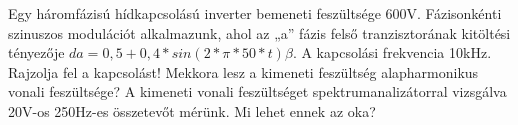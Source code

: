 \begin{example}

Egy háromfázisú hídkapcsolású inverter bemeneti feszültsége 600V. Fázisonkénti szinuszos modulációt alkalmazunk, ahol az „a” fázis felső tranzisztorának kitöltési tényezője $da=0,5+0,4*sin(2*\pi{}*50*t)\beta{}$. A kapcsolási frekvencia 10kHz. Rajzolja fel a kapcsolást! Mekkora lesz a kimeneti feszültség alapharmonikus vonali feszültsége? A kimeneti vonali feszültséget spektrumanalizátorral vizsgálva 20V-os 250Hz-es összetevőt mérünk. Mi lehet ennek az oka?

\tcbline
\vspace{1mm}

\solution

\end{example}